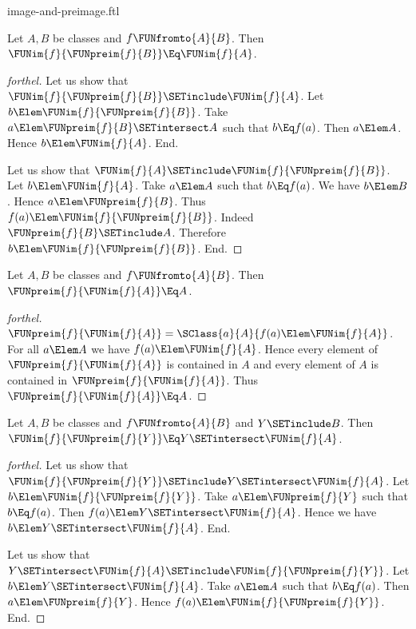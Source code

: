 \documentclass{stex}
\begin{document}
\begin{smodule}{image-and-preimage.ftl}
\begin{proposition}[forthel]
  Let $A, B$ be classes and $f \FUNfromto{A}{B}$.
  Then $\FUNim{f}{\FUNpreim{f}{B}} \Eq \FUNim{f}{A}$.
\end{proposition}
\begin{proof}[forthel]
  Let us show that $\FUNim{f}{\FUNpreim{f}{B}} \SETinclude \FUNim{f}{A}$.
    Let $b \Elem \FUNim{f}{\FUNpreim{f}{B}}$.
    Take $a \Elem \FUNpreim{f}{B} \SETintersect A$ such that $b \Eq f(a)$.
    Then $a \Elem A$.
    Hence $b \Elem \FUNim{f}{A}$.
  End.

  Let us show that $\FUNim{f}{A} \SETinclude \FUNim{f}{\FUNpreim{f}{B}}$.
    Let $b \Elem \FUNim{f}{A}$.
    Take $a \Elem A$ such that $b \Eq f(a)$.
    We have $b \Elem B$.
    Hence $a \Elem \FUNpreim{f}{B}$.
    Thus $f(a) \Elem \FUNim{f}{\FUNpreim{f}{B}}$.
    Indeed $\FUNpreim{f}{B} \SETinclude A$.
    Therefore $b \Elem \FUNim{f}{\FUNpreim{f}{B}}$.
  End.
\end{proof}

\begin{proposition}[forthel]
  Let $A, B$ be classes and $f \FUNfromto{A}{B}$.
  Then $\FUNpreim{f}{\FUNim{f}{A}} \Eq A$.
\end{proposition}
\begin{proof}[forthel]
  $\FUNpreim{f}{\FUNim{f}{A}} = \SClass{a}{A}{f(a) \Elem \FUNim{f}{A}}$.
  For all $a \Elem A$ we have $f(a) \Elem \FUNim{f}{A}$.
  Hence every element of $\FUNpreim{f}{\FUNim{f}{A}}$ is contained in $A$ and every element of $A$ is contained in $\FUNpreim{f}{\FUNim{f}{A}}$.
  Thus $\FUNpreim{f}{\FUNim{f}{A}} \Eq A$.
\end{proof}

\begin{proposition}[forthel]
  Let $A, B$ be classes and $f \FUNfromto{A}{B}$ and $Y \SETinclude B$.
  Then $\FUNim{f}{\FUNpreim{f}{Y}} \Eq Y \SETintersect \FUNim{f}{A}$.
\end{proposition}
\begin{proof}[forthel]
  Let us show that $\FUNim{f}{\FUNpreim{f}{Y}} \SETinclude Y \SETintersect \FUNim{f}{A}$.
    Let $b \Elem \FUNim{f}{\FUNpreim{f}{Y}}$.
    Take $a \Elem \FUNpreim{f}{Y}$ such that $b \Eq f(a)$.
    Then $f(a) \Elem Y \SETintersect \FUNim{f}{A}$.
    Hence we have $b \Elem Y \SETintersect \FUNim{f}{A}$.
  End.

  Let us show that $Y \SETintersect \FUNim{f}{A} \SETinclude \FUNim{f}{\FUNpreim{f}{Y}}$.
    Let $b \Elem Y \SETintersect \FUNim{f}{A}$.
    Take $a \Elem A$ such that $b \Eq f(a)$.
    Then $a \Elem \FUNpreim{f}{Y}$.
    Hence $f(a) \Elem \FUNim{f}{\FUNpreim{f}{Y}}$.
  End.
\end{proof}


\end{smodule}
\end{document}
